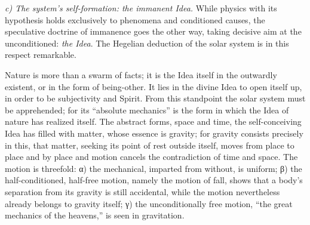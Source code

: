 \documentclass[12pt,a4paper]{book}
\newcommand{\runin}[1]{\emph{#1}\hspace{0.4em}}
\begin{document}
\runin{c) The system's self-formation: the immanent Idea.} While physics with its hypothesis holds
exclusively to phenomena and conditioned causes, the speculative doctrine of immanence goes the other way,
taking decisive aim at the unconditioned: \emph{the Idea}. The Hegelian deduction of the solar system is
in this respect remarkable.

Nature is more than a swarm of facts; it is the Idea itself in the outwardly existent, or in the form of
being-other. It lies in the divine Idea to open itself up, in order to be subjectivity and Spirit. From this
standpoint the solar system must be apprehended; for its ``absolute mechanics'' is the form in which the
Idea of nature has realized itself. The abstract forms, space and time, the self-conceiving Idea has
filled with matter, whose essence is gravity; for gravity consists precisely in this, that matter, seeking
its point of rest outside itself, moves from place to place and by place and motion cancels the
contradiction of time and space. The motion is threefold: α) the mechanical, imparted from without, is
uniform; β) the half-conditioned, half-free motion, namely the motion of fall, shows that a body's
separation from its gravity is still accidental, while the motion nevertheless already belongs to gravity
itself; γ) the unconditionally free motion, ``the great mechanics of the heavens,'' is seen in gravitation.
\end{document}
